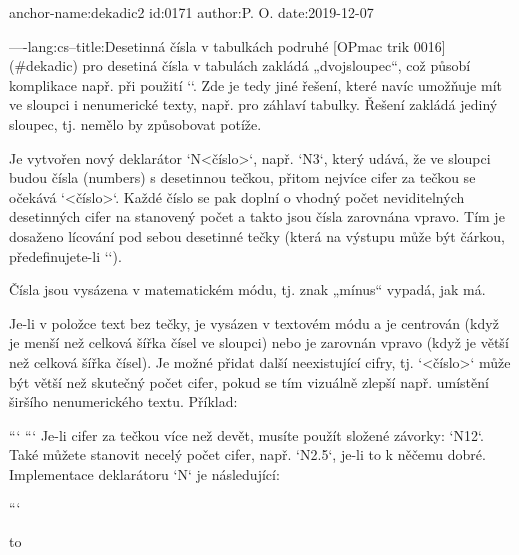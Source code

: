 anchor-name:dekadic2
id:0171
author:P. O.
date:2019-12-07

----lang:cs--title:Desetinná čísla v tabulkách podruhé
[OPmac trik 0016](#dekadic) pro desetiná čísla v tabulách zakládá „dvojsloupec“, což
působí komplikace např. při použití `\tskip`. Zde je tedy jiné řešení, které
navíc umožňuje mít ve sloupci i nenumerické texty, např. pro záhlaví
tabulky. Řešení zakládá jediný sloupec, tj. nemělo by způsobovat
potíže.

Je vytvořen nový deklarátor `N<číslo>`, např. `N3`, který udává, že ve sloupci
budou čísla (numbers) s desetinnou tečkou, přitom nejvíce cifer za tečkou se
očekává `<číslo>`. Každé číslo se pak doplní o vhodný počet neviditelných
desetinných cifer na stanovený počet a takto jsou čísla zarovnána vpravo.
Tím je dosaženo lícování pod sebou desetinné tečky (která na výstupu může být
čárkou, předefinujete-li `\decimalpoint`). 

Čísla jsou vysázena v matematickém módu, tj. znak „mínus“ vypadá, jak má.

Je-li v položce text bez tečky, je vysázen v textovém módu a je centrován 
(když je menší než celková šířka čísel ve sloupci) nebo je zarovnán vpravo 
(když je větší než celková šířka čísel). 
Je možné přidat další neexistující cifry, tj. `<číslo>` může být
větší než skutečný počet cifer, pokud se tím vizuálně zlepší např. umístění
širšího nenumerického textu. Příklad:

```
```
Je-li cifer za tečkou více než devět, musíte použít složené závorky:
`N{12}`. Také můžete stanovit necelý počet cifer, např. `N{2.5}`, je-li to k
něčemu dobré. Implementace deklarátoru `N` je následující:

```
\def\decimalpoint{.}

\def\paramtabdeclareN#1{\tabiteml\hfil\aligndecdigit#1##.\relax\tabitemr}
\def\aligndecdigit#1#2.#3{%
   \ifx\relax#3\hfil#2\unsskip\hfil \else
   \dimen0=.5em \dimen0=#1\dimen0 $#2$\decimalpoint
   \expandafter\aligndecdigitA\expandafter#3\fi
}
\def\aligndecdigitA#1.\relax{\hbox to}

\def\tableA#1#2{\offinterlineskip \colnum=0 \def\tmpa{}\tabdata={}\scantabdata#1\relax
   \def\tmpb{#2}\replacestrings{\crl}{\crcr\crl}%
      \replacestrings{\crli}{\crcr\crli}\replacestrings{\crll}{\crcr\crll}%
      \replacestrings{\crlli}{\crcr\crlli}\replacestrings{\crlp}{\crcr\crlp}%
   \halign\expandafter{\the\tabdata\cr\tmpb\crcr}\egroup}

